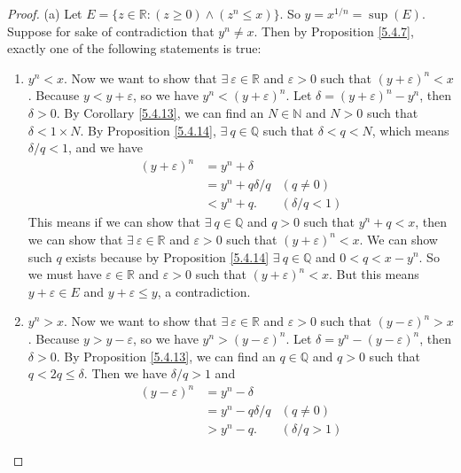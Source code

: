 \begin{proof}{(a)}
Let \(E = \{z \in \mathds{R} : (z \geq 0) \land (z^n \leq x)\}\).
So \(y = x^{1 / n} = \sup(E)\).
Suppose for sake of contradiction that \(y^n \neq x\).
Then by Proposition \ref{5.4.7}, exactly one of the following statements is true:
\begin{enumerate}[label=(\Roman*)]
    \item \(y^n < x\).
    Now we want to show that \(\exists\ \varepsilon \in \mathds{R}\) and \(\varepsilon > 0\) such that \((y + \varepsilon)^n < x\).
    Because \(y < y + \varepsilon\), so we have \(y^n < (y + \varepsilon)^n\).
    Let \(\delta = (y + \varepsilon)^n - y^n\), then \(\delta > 0\).
    By Corollary \ref{5.4.13}, we can find an \(N \in \mathds{N}\) and \(N > 0\) such that \(\delta < 1 \times N\).
    By Proposition \ref{5.4.14}, \(\exists\ q \in \mathds{Q}\) such that \(\delta < q < N\), which means \(\delta / q < 1\), and we have
    \begin{align*}
        (y + \varepsilon)^n &= y^n + \delta \\
        &= y^n + q \delta / q & (q \neq 0) \\
        &< y^n + q. & (\delta / q < 1)
    \end{align*}
    This means if we can show that \(\exists\ q \in \mathds{Q}\) and \(q > 0\) such that \(y^n + q < x\), then we can show that \(\exists\ \varepsilon \in \mathds{R}\) and \(\varepsilon > 0\) such that \((y + \varepsilon)^n < x\).
    We can show such \(q\) exists because by Proposition \ref{5.4.14} \(\exists\ q \in \mathds{Q}\) and \(0 < q < x - y^n\).
    So we must have \(\varepsilon \in \mathds{R}\) and \(\varepsilon > 0\) such that \((y + \varepsilon)^n < x\).
    But this means \(y + \varepsilon \in E\) and \(y + \varepsilon \leq y\), a contradiction.
    \item \(y^n > x\).
    Now we want to show that \(\exists\ \varepsilon \in \mathds{R}\) and \(\varepsilon > 0\) such that \((y - \varepsilon)^n > x\).
    Because \(y > y - \varepsilon\), so we have \(y^n > (y - \varepsilon)^n\).
    Let \(\delta = y^n - (y - \varepsilon)^n\), then \(\delta > 0\).
    By Proposition \ref{5.4.13}, we can find an \(q \in \mathds{Q}\) and \(q > 0\) such that \(q < 2q \leq \delta\).
    Then we have \(\delta / q > 1\) and
    \begin{align*}
        (y - \varepsilon)^n &= y^n - \delta \\
        &= y^n - q \delta / q & (q \neq 0) \\
        &> y^n - q. & (\delta / q > 1)

\end{align*}
\end{enumerate}
\end{proof}
